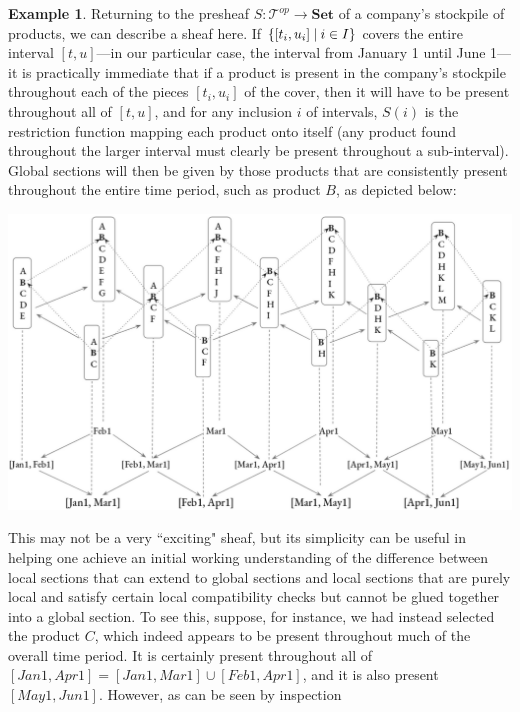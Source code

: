 \documentclass[a4paper]{book}
\theoremstyle{definition}
\newtheorem{example}{Example}[section]
\theoremstyle{definition}
\theoremstyle{definition}
\theoremstyle{theorem}
\theoremstyle{definition}
\begin{document}
\begin{example}
	Returning to the presheaf $S: \mathcal{T}^{op} \rightarrow \textbf{Set}$ of a company's stockpile of products, we can describe a sheaf here. If $\{[t_i, u_i] \hspace*{0.25em}| \hspace*{0.25em} i \in I \}$ covers the entire interval $[t,u]$---in our particular case, the interval from January 1 until June 1---it is practically immediate that if a product is present in the company's stockpile throughout each of the pieces $[t_i, u_i]$ of the cover, then it will have to be present throughout all of $[t,u]$, and for any inclusion $i$ of intervals, $S(i)$ is the restriction function mapping each product onto itself (any product found throughout the larger interval must clearly be present throughout a sub-interval). Global sections will then be given by those products that are consistently present throughout the entire time period, such as product $B$, as depicted below: 
	\begin{center}
		\includegraphics*[scale=0.25]{GlobalSectionTimeIntervalDiagram.png}
	\end{center}  
	This may not be a very ``exciting" sheaf, but its simplicity can be useful in helping one achieve an initial working understanding of the difference between local sections that can extend to global sections and local sections that are purely local and satisfy certain local compatibility checks but cannot be glued together into a global section. To see this, suppose, for instance, we had instead selected the product $C$, which indeed appears to be present throughout much of the overall time period. It is certainly present throughout all of $[Jan1, Apr1] = [Jan1, Mar1] \cup [Feb1, Apr1]$, and it is also present $[May1, Jun1]$. However, as can be seen by inspection 

\end{example}
\end{document}
